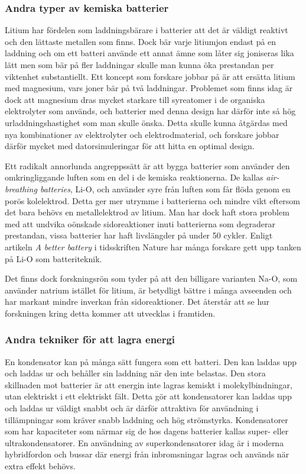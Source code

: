 \documentclass[a4paper,12pt]{article}
\begin{document}
\subsubsection{Andra typer av kemiska batterier}
Litium har fördelen som laddningsbärare i batterier att det är väldigt reaktivt och den lättaste metallen som finns. Dock bär varje litiumjon endast på en laddning och om ett batteri använde ett annat ämne som låter sig joniseras lika lätt men som bär på fler laddningar skulle man kunna öka prestandan per viktenhet substantiellt. Ett koncept som forskare jobbar på är att ersätta litium med magnesium, vars joner bär på två laddningar. Problemet som finns idag är dock att magnesium dras mycket starkare till syreatomer i de organiska elektrolyter som används, och batterier med denna design har därför inte så hög urladdningshastighet som man skulle önska. Detta skulle kunna åtgärdas med nya kombinationer av elektrolyter och elektrodmaterial, och forskare jobbar därför mycket med datorsimuleringar för att hitta en optimal design. \cite{better-battery}

Ett radikalt annorlunda angreppssätt är att bygga batterier som använder den omkringliggande luften som en del i de kemiska reaktionerna. De kallas \emph{air-breathing batteries}, Li-O, och använder syre från luften som får flöda genom en porös kolelektrod. Detta ger mer utrymme i batterierna och mindre vikt eftersom det bara behövs en metallelektrod av litium. Man har dock haft stora problem med att undvika oönskade sidoreaktioner inuti batterierna som degraderar prestandan, vissa batterier har haft livslängder på under 50 cykler. Enligt artikeln \emph{A better battery} i tidsskriften Nature har många forskare gett upp tanken på Li-O som batteriteknik. \cite{better-battery}

Det finns dock forskningsrön som tyder på att den billigare varianten Na-O, som använder natrium istället för litium, är betydligt bättre i många avseenden och har markant mindre inverkan från sidoreaktioner. Det återstår att se hur forskningen kring detta kommer att utvecklas i framtiden. \cite{better-battery}

\subsubsection{Andra tekniker för att lagra energi}
En kondensator kan på många sätt fungera som ett batteri. Den kan laddas upp och laddas ur och behåller sin laddning när den inte belastas. Den stora skillnaden mot batterier är att energin inte lagras kemiskt i molekylbindningar, utan elektriskt i ett elektriskt fält. Detta gör att kondensatorer kan laddas upp och laddas ur väldigt snabbt och är därför attraktiva för användning i tillämpningar som kräver snabb laddning och hög strömstyrka. Kondensatorer som har kapaciteter som närmar sig de hos dagens batterier kallas super- eller ultrakondensatorer. En användning av superkondensatorer idag är i moderna hybridfordon och bussar där energi från inbromsningar lagras och används när extra effekt behövs.\cite{capacitors}
\end{document}
